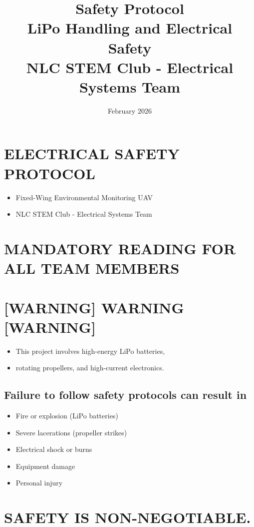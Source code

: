 \documentclass[11pt,letterpaper]{article}
\title{\Huge\textbf{Safety Protocol}\\
\Large LiPo Handling and Electrical Safety\\
\large NLC STEM Club - Electrical Systems Team}
\author{February 2026}
\date{}
\begin{document}
\maketitle
\thispagestyle{empty}
\newpage
\section{ELECTRICAL SAFETY PROTOCOL}

\begin{itemize}
  \item Fixed-Wing Environmental Monitoring UAV
  \item NLC STEM Club - Electrical Systems Team
\end{itemize}

\section{MANDATORY READING FOR ALL TEAM MEMBERS}

\section{[WARNING] WARNING [WARNING]}

\begin{itemize}
  \item This project involves high-energy LiPo batteries,
  \item rotating propellers, and high-current electronics.
\end{itemize}

\subsection{Failure to follow safety protocols can result in}

\begin{itemize}
  \item Fire or explosion (LiPo batteries)
  \item Severe lacerations (propeller strikes)
  \item Electrical shock or burns
  \item Equipment damage
  \item Personal injury
\end{itemize}

\section{SAFETY IS NON-NEGOTIABLE.}
\end{document}
